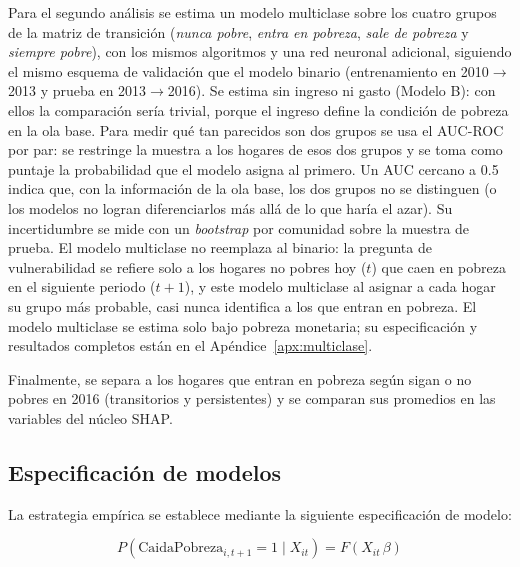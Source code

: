\documentclass[12pt, letterpaper]{article}
\begin{document}
Para el segundo análisis se estima un modelo multiclase sobre los cuatro
grupos de la matriz de transición (\emph{nunca pobre}, \emph{entra en
pobreza}, \emph{sale de pobreza} y \emph{siempre pobre}), con los mismos
algoritmos y una red neuronal adicional, siguiendo el mismo esquema de validación que el modelo binario
(entrenamiento en 2010$\to$2013 y prueba en 2013$\to$2016). Se estima sin
ingreso ni gasto (Modelo B): con ellos la comparación sería trivial,
porque el ingreso define la condición de pobreza en la ola base. Para
medir qué tan parecidos son dos grupos se usa el AUC-ROC por par: se
restringe la muestra a los hogares de esos dos grupos y se toma como
puntaje la probabilidad que el modelo asigna al primero. Un AUC cercano a
0.5 indica que, con la información de la ola base, los dos grupos no se
distinguen (o los modelos no logran diferenciarlos más allá de lo que haría
el azar). Su incertidumbre se mide con un \emph{bootstrap} por
comunidad sobre la muestra de prueba. El modelo multiclase no reemplaza
al binario: la pregunta de vulnerabilidad se refiere solo a los hogares
no pobres hoy ($t$) que caen en pobreza en el siguiente periodo ($t+1$), 
y este modelo multiclase al asignar a cada hogar su grupo más probable, casi
nunca identifica a los que entran en pobreza. El modelo multiclase
se estima solo bajo pobreza
monetaria; su especificación y resultados completos están en el
Apéndice~\ref{apx:multiclase}.

Finalmente, se separa a los hogares que entran en pobreza según sigan o
no pobres en 2016 (transitorios y persistentes) y se comparan sus
promedios en las variables del núcleo SHAP.

\subsection{Especificación de modelos}
\label{subsec:modelos}
La estrategia empírica se establece mediante la siguiente especificación 
de modelo:

\begin{equation}
  P\!\left(\text{CaidaPobreza}_{i,t+1} = 1 \mid X_{it}\right)
  = F\!\left(X_{it}\,\beta\right)
  \label{eq:modelo_base}
\end{equation}
\end{document}

